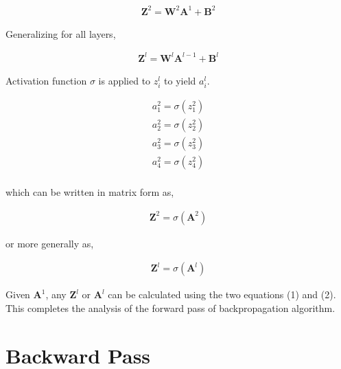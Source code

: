 \documentclass[11pt, a4paper]{article}
\begin{document}
\begin{align*}
	\boldsymbol{Z}^2 = \boldsymbol{W}^2 \boldsymbol{A}^1 + \boldsymbol{B}^2 
\end{align*}

Generalizing for all layers,

\begin{align}
	\boldsymbol{Z}^l = \boldsymbol{W}^l \boldsymbol{A}^{l-1} + \boldsymbol{B}^l 
\end{align}

Activation function $\sigma$ is applied to $z^l_i$ to yield $a^l_i$.

\begin{align*}
	a^2_1 = \sigma(z^2_1) \\
	a^2_2 = \sigma(z^2_2) \\
	a^2_3 = \sigma(z^2_3) \\
	a^2_4 = \sigma(z^2_4) \\
\end{align*} 

which can be written in matrix form as,

\begin{align*}
	\boldsymbol{Z}^2 = \sigma(\boldsymbol{A}^2) 
\end{align*}

or more generally as,

\begin{align}
	\boldsymbol{Z}^l = \sigma(\boldsymbol{A}^l) 
\end{align}

Given $\boldsymbol{A}^1$, any $\boldsymbol{Z}^l$ or $\boldsymbol{A}^l$ can be calculated using the two equations (1) and (2). This completes the analysis of the forward pass of backpropagation algorithm.

\section{Backward Pass}
\end{document}
